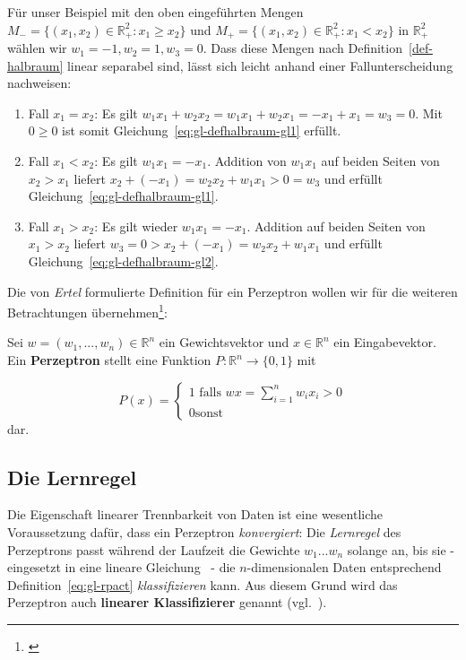 \noindent
Für unser Beispiel mit den oben eingeführten Mengen $M_- = \{(x_1, x_2) \in  \mathbb{R}_+^2: x_1 \geq x_2\}$ und $M_+=\{(x_1, x_2) \in  \mathbb{R}_+^2: x_1 < x_2\}$ in $ \mathbb{R}_+^2$ wählen wir $w_1 = -1, w_2 = 1, w_3 = 0$.
Dass diese Mengen nach Definition~\ref{def-halbraum} linear separabel sind, lässt sich leicht anhand einer Fallunterscheidung nachweisen:

\begin{enumerate}
    \item Fall $x_1 = x_2$: Es gilt $w_1x_1 + w_2x_2 = w_1x_1 + w_2x_1 = -x_1 + x_1 = w_3 = 0$. Mit $0 \geq 0$ ist somit Gleichung~\ref{eq:gl-defhalbraum-gl1} erfüllt.
    \item Fall $x_1 < x_2$: Es gilt $w_1x_1 = -x_1$. Addition von $w_1x_1$ auf beiden Seiten von $x_2 > x_1$ liefert $x_2 + (-x_1) = w_2x_2 + w_1x_1 > 0 = w_3$ und erfüllt Gleichung~\ref{eq:gl-defhalbraum-gl1}.
    \item Fall $x_1 > x_2$: Es gilt wieder $w_1x_1 = -x_1$. Addition auf beiden Seiten von $x_1 > x_2$ liefert $w_3 = 0 > x_2 + (-x_1) = w_2x_2 + w_1x_1$ und erfüllt Gleichung~\ref{eq:gl-defhalbraum-gl2}.
\end{enumerate}


\noindent
Die von \textit{Ertel} formulierte Definition für ein Perzeptron wollen wir für die weiteren Betrachtungen übernehmen\footnote{
    \cite[212, ``Definition 8.3``, Hervorhebungen i.O.]{Ert21a}
}:

\begin{definition}
\noindent
Sei $w = (w_1, ..., w_n) \in  \mathbb{R}^n$ ein Gewichtsvektor und $x \in  \mathbb{R}^n$ ein Eingabevektor. Ein \textbf{Perzeptron} stellt eine Funktion $P:  \mathbb{R}^n \to \{0, 1\}$ mit

\begin{equation}
P(x) = \begin{cases}
            1 \text{ falls } wx = \sum^n_{i=1} w_ix_i >0 \\
            0 \text{sonst}
\end{cases}
\end{equation}
\noindent
dar.

\end{definition}

\subsection{Die Lernregel}\label{sec-lernregel}

Die Eigenschaft linearer Trennbarkeit von Daten ist eine wesentliche Voraussetzung dafür, dass ein Perzeptron \textit{konvergiert}: Die \textit{Lernregel} des Perzeptrons passt während der Laufzeit die Gewichte $w_1 ... w_n$ solange an, bis sie - eingesetzt in eine lineare Gleichung~\cite[311]{Ert21b} - die $n$-dimensionalen Daten entsprechend Definition~\ref{eq:gl-rpact} \textit{klassifizieren} kann.
Aus diesem Grund wird das Perzeptron auch \textbf{linearer Klassifizierer} genannt (vgl.~\cite[210-216]{Ert21a}).

